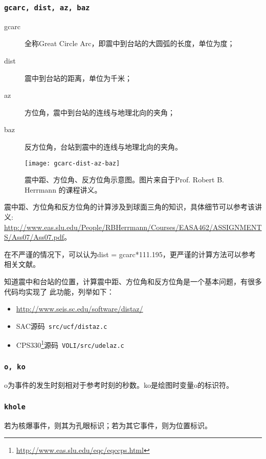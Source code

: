 \subsubsection{\texttt{gcarc, dist, az, baz}}
\begin{description}
\item [gcarc] 全称Great Circle Arc，即震中到台站的大圆弧的长度，单位为度；
\item [dist] 震中到台站的距离，单位为千米；
\item [az] 方位角，震中到台站的连线与地理北向的夹角；
\item [baz] 反方位角，台站到震中的连线与地理北向的夹角。
\end{description}

\begin{figure}[H]
\centering
\texttt{[image: gcarc-dist-az-baz]}
\caption[震中距、方位角、反方位角示意图]{震中距、方位角、反方位角示意图。图片来自于Prof. Robert B. Herrmann 的课程讲义。}
\label{fig:gcarc-dist-az-baz}
\end{figure}

震中距、方位角和反方位角的计算涉及到球面三角的知识，具体细节可以参考该讲义:\\
\scriptsize\url{http://www.eas.slu.edu/People/RBHerrmann/Courses/EASA462/ASSIGNMENTS/Ass07/Ass07.pdf}。

\normalsize
在不严谨的情况下，可以认为dist = gcarc*111.195，更严谨的计算方法可以参考相关文献。

知道震中和台站的位置，计算震中距、方位角和反方位角是一个基本问题，有很多代码均实现了
此功能，列举如下：
\begin{itemize}
\item \url{http://www.seis.sc.edu/software/distaz/}
\item SAC源码~\verb+src/ucf/distaz.c+
\item CPS330\footnote{\url{http://www.eas.slu.edu/eqc/eqccps.html}}源码~\verb+VOLI/src/udelaz.c+
\end{itemize}

\subsubsection{\texttt{o, ko}}
o为事件的发生时刻相对于参考时刻的秒数。ko是绘图时变量o的标识符。

\subsubsection{\texttt{khole}}
若为核爆事件，则其为孔眼标识；若为其它事件，则为位置标识。

